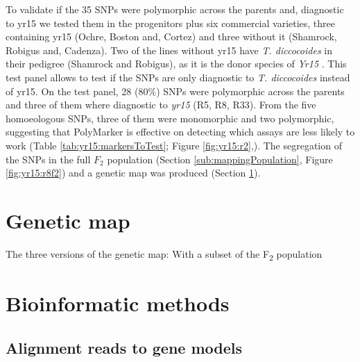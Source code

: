 

To validate if the 35 SNPs were polymorphic across the parents and, diagnostic to \acrshort{yr15} we tested them in the progenitors plus six commercial varieties, three containing \acrshort{yr15} (Ochre, Boston and, Cortez) and three without it (Shamrock, Robigus and, Cadenza).
Two of the lines without \acrshort{yr15} have \textit{T. diccocoides} in their pedigree (Shamrock and Robigus), as it is the donor species of \textit{Yr15} \citep{mcintosh1995}. 
This test panel allows to test if the SNPs are only diagnostic to \textit{T. diccocoides} instead of \acrshort{yr15}.
On the test panel, 28 ($80\%$) SNPs were polymorphic across the parents and three of them where diagnostic to \textit{yr15} (R5, R8, R33).
From the five homoeologous SNPs, three of them were monomorphic and two polymorphic, suggesting that PolyM{}arker is effective on detecting which assays are less likely to work (Table \ref{tab:yr15:markersToTest}; Figure \ref{fig:yr15:r2},).
The segregation of the SNPs in the full $F_{2}$ population (Section \ref{sub:mappingPopulation}, Figure \ref{fig:yr15:r8f2}) and a genetic map was produced (Section \ref{yr15:geneticMap}).   




\section{Genetic map} 
\label{yr15:geneticMap}
The three versions of the genetic map: With a subset of the F\textsubscript{2} population

\section{Bioinformatic methods}

\subsection{Alignment reads to gene models}


